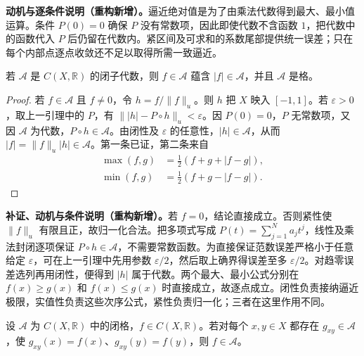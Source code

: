 \documentclass[../../main.tex]{subfiles}%
\begin{document}
\begin{remark}
\textbf{动机与逐条件说明（重构新增）。}逼近绝对值是为了由乘法代数得到最大、最小值运算。条件 $P(0)=0$ 确保 $P$ 没有常数项，因此即使代数不含函数 $1$，把代数中的函数代入 $P$ 后仍留在代数内。紧区间及可求和的系数尾部提供统一误差；只在每个内部点逐点收敛还不足以取得所需一致逼近。
\end{remark}
\begin{lemma}\label{lemma:ch04-closed-algebra-lattice}
若 $\mathcal A$ 是 $C(X,\mathbb R)$ 的闭子代数，则 $f\in\mathcal A$ 蕴含 $|f|\in\mathcal A$，并且 $\mathcal A$ 是格。
\end{lemma}
\begin{proof}
若 $f\in\mathcal A$ 且 $f\ne0$，令 $h=f/\|f\|_u$。则 $h$ 把 $X$ 映入 $[-1,1]$。若 $\varepsilon>0$，取上一引理中的 $P$，有 $\||h|-P\circ h\|_u<\varepsilon$。因 $P(0)=0$，$P$ 无常数项，又因 $\mathcal A$ 为代数，$P\circ h\in\mathcal A$。由闭性及 $\varepsilon$ 的任意性，$|h|\in\mathcal A$，从而 $|f|=\|f\|_u|h|\in\mathcal A$。第一条已证，第二条来自
\begin{align*}
\max(f,g)&=\tfrac12(f+g+|f-g|),\\
\min(f,g)&=\tfrac12(f+g-|f-g|).
\end{align*}
\end{proof}
\begin{remark}
\textbf{补证、动机与条件说明（重构新增）。}若 $f=0$，结论直接成立。否则紧性使 $\|f\|_u$ 有限且正，故归一化合法。把多项式写成 $P(t)=\sum_{j=1}^Na_jt^j$，线性及乘法封闭逐项保证 $P\circ h\in\mathcal A$，不需要常数函数。为直接保证范数误差严格小于任意给定 $\varepsilon$，可在上一引理中先用参数 $\varepsilon/2$，然后取上确界得误差至多 $\varepsilon/2$。对趋零误差选列再用闭性，便得到 $|h|$ 属于代数。两个最大、最小公式分别在 $f(x)\ge g(x)$ 和 $f(x)\le g(x)$ 时直接成立，故逐点成立。闭性负责接纳逼近极限，实值性负责这些次序公式，紧性负责归一化；三者在这里作用不同。
\end{remark}
\begin{lemma}\label{lemma:ch04-two-point-lattice-approximation}
设 $\mathcal A$ 为 $C(X,\mathbb R)$ 中的闭格，$f\in C(X,\mathbb R)$。若对每个 $x,y\in X$ 都存在 $g_{xy}\in\mathcal A$，使 $g_{xy}(x)=f(x)$、$g_{xy}(y)=f(y)$，则 $f\in\mathcal A$。
\end{lemma}
\end{document}
